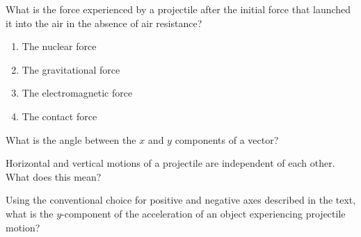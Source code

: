 \documentclass[main-physics.tex]{subfiles}
\begin{document}
\clearpage

\begin{exercise} \label{uLtw6P}
    What is the force experienced by a projectile after the initial force that launched it into the air in the absence of air resistance?

    \begin{enumerate}[label=\Alph*.]
        \item The nuclear force
        \item The gravitational force
        \item The electromagnetic force
        \item The contact force
    \end{enumerate}
\end{exercise}

\begin{exercise} \label{90PABl}
    What is the angle between the $x$ and $y$ components of a vector?
\end{exercise}

\begin{exercise}
    Horizontal and vertical motions of a projectile are independent of each other. What does this mean?
\end{exercise}

\begin{exercise} \label{YYBBp5}
    Using the conventional choice for positive and negative axes described in the text, what is the $y$-component of the acceleration of an object experiencing projectile motion?
\end{exercise}



\end{document}
